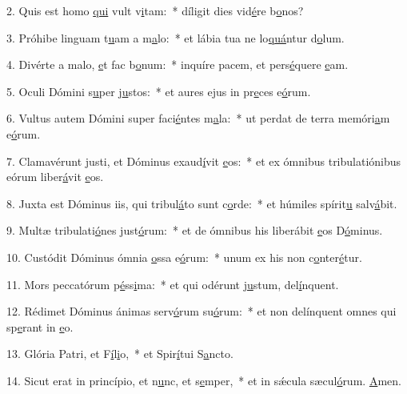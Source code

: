 2. Quis est homo \uline{qui} vult v\uline{i}tam:~* díligit dies vid\uline{é}re b\uline{o}nos?\par 
3. Próhibe linguam t\uline{u}am a m\uline{a}lo:~* et lábia tua ne lo\uline{quá}ntur d\uline{o}lum.\par 
4. Divérte a malo, \uline{e}t fac b\uline{o}num:~* inquíre pacem, et pers\uline{é}quere \uline{e}am.\par 
5. Oculi Dómini s\uline{u}per j\uline{u}stos:~* et aures ejus in pr\uline{e}ces e\uline{ó}rum.\par 
6. Vultus autem Dómini super faci\uline{é}ntes m\uline{a}la:~* ut perdat de terra memóri\uline{a}m e\uline{ó}rum.\par 
7. Clamavérunt justi, et Dóminus exaud\uline{í}vit \uline{e}os:~* et ex ómnibus tribulatiónibus eórum liber\uline{á}vit \uline{e}os.\par 
8. Juxta est Dóminus iis, qui tribul\uline{á}to sunt c\uline{o}rde:~* et húmiles spírit\uline{u} salv\uline{á}bit.\par 
9. Multæ tribulati\uline{ó}nes just\uline{ó}rum:~* et de ómnibus his liberábit \uline{e}os D\uline{ó}minus.\par 
10. Custódit Dóminus ómnia \uline{o}ssa e\uline{ó}rum:~* unum ex his non c\uline{o}nter\uline{é}tur.\par 
11. Mors peccatórum p\uline{é}ss\uline{i}ma:~* et qui odérunt j\uline{u}stum, del\uline{í}nquent.\par 
12. Rédimet Dóminus ánimas serv\uline{ó}rum su\uline{ó}rum:~* et non delínquent omnes qui sp\uline{e}rant in \uline{e}o.\par 
13. Glória Patri, et F\uline{í}l\uline{i}o,~* et Spir\uline{í}tui S\uline{a}ncto.\par 
14. Sicut erat in princípio, et n\uline{u}nc, et s\uline{e}mper,~* et in sǽcula sæcul\uline{ó}rum. \uline{A}men.\par 
